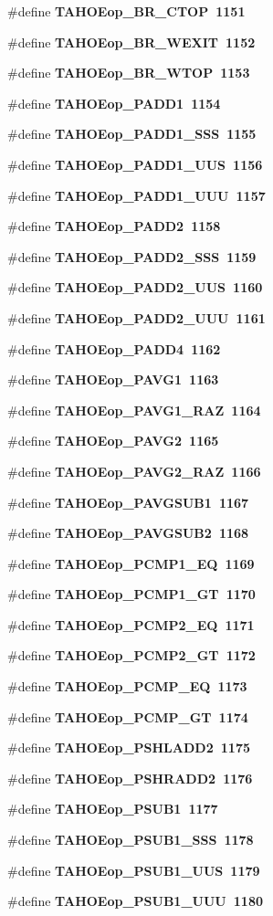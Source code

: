 \begin{CompactItemize}
\item 
\#define \bf{TAHOEop\_\-BR\_\-CTOP}~1151
\item 
\#define \bf{TAHOEop\_\-BR\_\-WEXIT}~1152
\item 
\#define \bf{TAHOEop\_\-BR\_\-WTOP}~1153
\item 
\#define \bf{TAHOEop\_\-PADD1}~1154
\item 
\#define \bf{TAHOEop\_\-PADD1\_\-SSS}~1155
\item 
\#define \bf{TAHOEop\_\-PADD1\_\-UUS}~1156
\item 
\#define \bf{TAHOEop\_\-PADD1\_\-UUU}~1157
\item 
\#define \bf{TAHOEop\_\-PADD2}~1158
\item 
\#define \bf{TAHOEop\_\-PADD2\_\-SSS}~1159
\item 
\#define \bf{TAHOEop\_\-PADD2\_\-UUS}~1160
\item 
\#define \bf{TAHOEop\_\-PADD2\_\-UUU}~1161
\item 
\#define \bf{TAHOEop\_\-PADD4}~1162
\item 
\#define \bf{TAHOEop\_\-PAVG1}~1163
\item 
\#define \bf{TAHOEop\_\-PAVG1\_\-RAZ}~1164
\item 
\#define \bf{TAHOEop\_\-PAVG2}~1165
\item 
\#define \bf{TAHOEop\_\-PAVG2\_\-RAZ}~1166
\item 
\#define \bf{TAHOEop\_\-PAVGSUB1}~1167
\item 
\#define \bf{TAHOEop\_\-PAVGSUB2}~1168
\item 
\#define \bf{TAHOEop\_\-PCMP1\_\-EQ}~1169
\item 
\#define \bf{TAHOEop\_\-PCMP1\_\-GT}~1170
\item 
\#define \bf{TAHOEop\_\-PCMP2\_\-EQ}~1171
\item 
\#define \bf{TAHOEop\_\-PCMP2\_\-GT}~1172
\item 
\#define \bf{TAHOEop\_\-PCMP\_\-EQ}~1173
\item 
\#define \bf{TAHOEop\_\-PCMP\_\-GT}~1174
\item 
\#define \bf{TAHOEop\_\-PSHLADD2}~1175
\item 
\#define \bf{TAHOEop\_\-PSHRADD2}~1176
\item 
\#define \bf{TAHOEop\_\-PSUB1}~1177
\item 
\#define \bf{TAHOEop\_\-PSUB1\_\-SSS}~1178
\item 
\#define \bf{TAHOEop\_\-PSUB1\_\-UUS}~1179
\item 
\#define \bf{TAHOEop\_\-PSUB1\_\-UUU}~1180

\end{CompactItemize}
